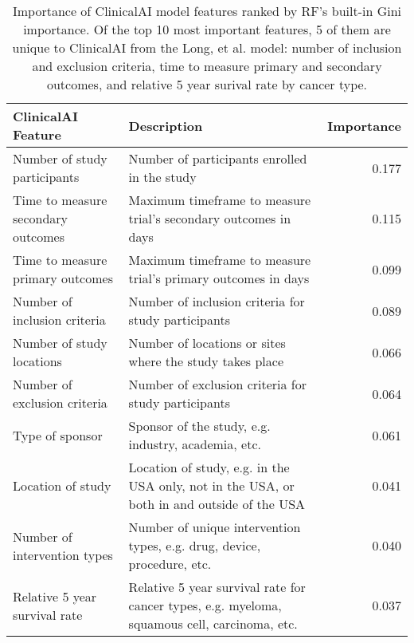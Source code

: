 \begin{table}
\caption{Importance of ClinicalAI model features ranked by RF's built-in Gini importance. Of the top 10 most important features, 5 of them are unique to ClinicalAI from the Long, et al. model: number of inclusion and exclusion criteria, time to measure primary and secondary outcomes, and relative 5 year surival rate by cancer type.}
\label{tab:feature_importance}
\begin{tabular}{llr}
\toprule
ClinicalAI Feature & Description & Importance \\
\midrule
Number of study participants & Number of participants enrolled in the study & 0.177 \\
Time to measure secondary outcomes & Maximum timeframe to measure trial's secondary outcomes in days & 0.115 \\
Time to measure primary outcomes & Maximum timeframe to measure trial's primary outcomes in days & 0.099 \\
Number of inclusion criteria & Number of inclusion criteria for study participants & 0.089 \\
Number of study locations & Number of locations or sites where the study takes place & 0.066 \\
Number of exclusion criteria & Number of exclusion criteria for study participants & 0.064 \\
Type of sponsor & Sponsor of the study, e.g. industry, academia, etc. & 0.061 \\
Location of study & Location of study, e.g. in the USA only, not in the USA, or both in and outside of the USA & 0.041 \\
Number of intervention types & Number of unique intervention types, e.g. drug, device, procedure, etc. & 0.040 \\
Relative 5 year survival rate & Relative 5 year survival rate for cancer types, e.g. myeloma, squamous cell, carcinoma, etc. & 0.037 \\
\bottomrule
\end{tabular}
\end{table}

